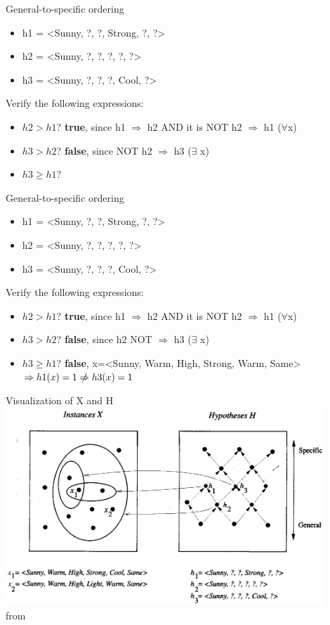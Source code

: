 \documentclass{beamer}
\begin{document}
\begin{frame}{General-to-specific ordering}
\begin{itemize}
\item h1 = <Sunny, ?, ?, Strong, ?, ?>
\item h2 = <Sunny, ?, ?, ?, ?, ?>
\item h3 = <Sunny, ?, ?, ?, Cool, ?>
\end{itemize}

Verify the following expressions:
\begin{itemize}
\item $h2 > h1$? \textbf{true}, since h1 $\Rightarrow$ h2 AND it is NOT h2 $\Rightarrow$ h1 ($\forall $x)
\item $h3 > h2$? \textbf{false}, since NOT h2 $\Rightarrow$ h3 ($\exists$ x)
\item $h3 \geq h1$? 
\end{itemize}
\end{frame}

\begin{frame}{General-to-specific ordering}
\begin{itemize}
\item h1 = <Sunny, ?, ?, Strong, ?, ?>
\item h2 = <Sunny, ?, ?, ?, ?, ?>
\item h3 = <Sunny, ?, ?, ?, Cool, ?>
\end{itemize}

Verify the following expressions:
\begin{itemize}
\item $h2 > h1$? \textbf{true}, since h1 $\Rightarrow$ h2 AND it is NOT h2 $\Rightarrow$ h1 ($\forall $x)
\item $h3 > h2$? \textbf{false}, since h2 NOT $\Rightarrow$ h3 ($\exists$ x)
\item $h3 \geq h1$? \textbf{false}, x=<Sunny, Warm, High, Strong, Warm, Same> $\Rightarrow h1(x)=1 \centernot \Rightarrow h3(x)=1$
\end{itemize}
\end{frame}

\begin{frame}{Visualization of X and H}
\centering
\includegraphics[width=0.9\textwidth]{X_and_H}
\\from \cite{mitchell1997a}
\end{frame}
\end{document}

